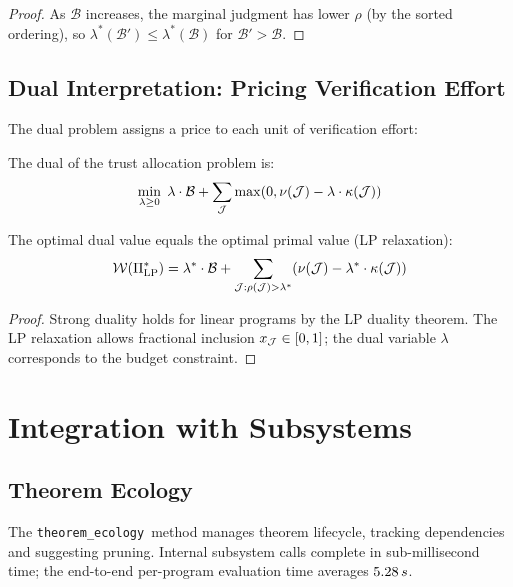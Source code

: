 \documentclass[11pt]{article}
\newcommand{\VerifBudget}{\mathcal{B}}
\newcommand{\TrustValue}{\nu}
\newcommand{\VerifCost}{\kappa}
\newcommand{\TrustReturn}{\rho}
\newcommand{\ThmEcol}{\texttt{theorem\_ecology}}
\newcommand{\Welfare}{\mathcal{W}}
\newcommand{\Shadow}{\lambda}
\begin{document}
\begin{proof}
As $\VerifBudget$ increases, the marginal judgment has lower
$\TrustReturn$ (by the sorted ordering), so
$\Shadow^*(\VerifBudget') \leq \Shadow^*(\VerifBudget)$ for
$\VerifBudget' > \VerifBudget$.
\end{proof}

\subsection{Dual Interpretation: Pricing Verification Effort}

The dual problem assigns a price to each unit of verification
effort:

\begin{definition}\label{def:dual}
The dual of the trust allocation problem is:
\[
  \min_{\Shadow \geq 0} \; \Shadow \cdot \VerifBudget +
  \sum_{\J} \max(0, \TrustValue(\J) - \Shadow \cdot \VerifCost(\J))
\]
\end{definition}

\begin{theorem}\label{thm:strong-duality}
The optimal dual value equals the optimal primal value (LP relaxation):
\[
  \Welfare(\Pi^*_{\text{LP}}) = \Shadow^* \cdot \VerifBudget +
  \sum_{\J : \TrustReturn(\J) > \Shadow^*} (\TrustValue(\J) -
  \Shadow^* \cdot \VerifCost(\J))
\]
\end{theorem}

\begin{proof}
Strong duality holds for linear programs by the LP duality theorem.
The LP relaxation allows fractional inclusion $x_{\mathcal{J}} \in [0,1]$;
the dual variable $\Shadow$ corresponds to the budget constraint.
\end{proof}

\section{Integration with Subsystems}\label{sec:integration}

\subsection{Theorem Ecology}
The \ThmEcol\ method manages theorem lifecycle, tracking dependencies
and suggesting pruning.  Internal subsystem calls complete in sub-millisecond
time; the end-to-end per-program evaluation time averages $5.28\,s$.
\end{document}
